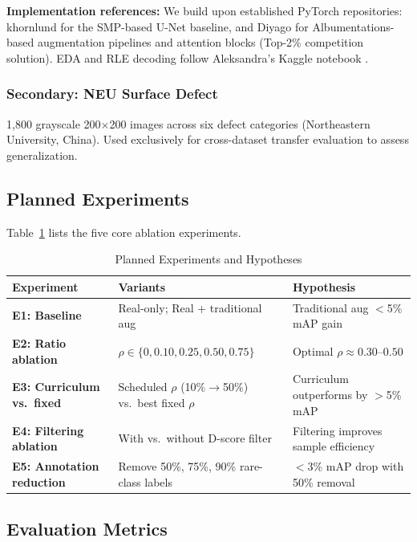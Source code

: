 \documentclass[conference]{IEEEtran}
\begin{document}
\textbf{Implementation references:}
We build upon established PyTorch repositories: khornlund
\cite{khornlund_repo} for the SMP-based U-Net baseline, and Diyago
\cite{diyago_repo} for Albumentations-based augmentation pipelines
and attention blocks (Top-2\% competition solution). EDA and RLE
decoding follow Aleksandra's Kaggle notebook \cite{aleksandra_eda}.

\subsubsection{Secondary: NEU Surface Defect}
1,800 grayscale 200$\times$200 images across six defect categories
(Northeastern University, China). Used exclusively for cross-dataset
transfer evaluation to assess generalization.

\subsection{Planned Experiments}

Table~\ref{tab:experiments} lists the five core ablation experiments.

\begin{table}[h]
\centering
\caption{Planned Experiments and Hypotheses}
\label{tab:experiments}
\renewcommand{\arraystretch}{1.25}
\begin{tabularx}{\columnwidth}{>{\bfseries}l X X}
\toprule
\textbf{Experiment} & \textbf{Variants} & \textbf{Hypothesis} \\
\midrule
E1: Baseline
& Real-only; Real + traditional aug
& Traditional aug $<$5\% mAP gain \\
\addlinespace
E2: Ratio ablation
& $\rho \in \{0, 0.10, 0.25, 0.50, 0.75\}$
& Optimal $\rho \approx 0.30$--$0.50$ \\
\addlinespace
E3: Curriculum vs.\ fixed
& Scheduled $\rho$ (10\%$\to$50\%) vs.\ best fixed $\rho$
& Curriculum outperforms by $>$5\% mAP \\
\addlinespace
E4: Filtering ablation
& With vs.\ without D-score filter
& Filtering improves sample efficiency \\
\addlinespace
E5: Annotation reduction
& Remove 50\%, 75\%, 90\% rare-class labels
& $<$3\% mAP drop with 50\% removal \\
\bottomrule
\end{tabularx}
\end{table}

\subsection{Evaluation Metrics}
\end{document}
